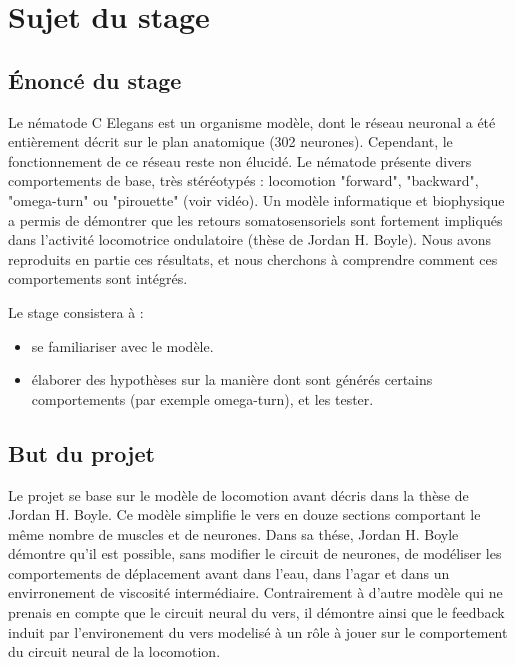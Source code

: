 \chapter{Sujet du stage} %
\label{cha:Sujet du stage}

\section{Énoncé du stage} %
\label{sec:Énoncé du stage}

Le nématode C Elegans est un organisme modèle, dont le réseau neuronal a été entièrement décrit sur le plan
anatomique (302 neurones). Cependant, le fonctionnement de ce réseau reste non élucidé. Le nématode présente
divers comportements de base, très stéréotypés : locomotion "forward", "backward", "omega-turn" ou "pirouette"
(voir vidéo). Un modèle informatique et biophysique a permis de démontrer que les retours somatosensoriels
sont fortement impliqués dans l’activité locomotrice ondulatoire (thèse de Jordan H. Boyle). Nous avons
reproduits en partie ces résultats, et nous cherchons à comprendre comment ces comportements sont intégrés.


Le stage consistera à :
\begin{itemize}
   \item se familiariser avec le modèle.
   \item élaborer des hypothèses sur la manière dont sont générés certains comportements (par exemple
      omega-turn), et les tester.
\end{itemize}


\section{But du projet} %
\label{sec:But du projet}

Le projet se base sur le modèle de locomotion avant décris dans la thèse de Jordan H. Boyle\cite{Boyle2009}.
Ce modèle simplifie le vers en douze sections comportant le même nombre de muscles et de neurones.
Dans sa thése, Jordan H. Boyle démontre qu'il est possible, sans modifier le circuit de neurones, de
modéliser les comportements de déplacement avant dans l'eau, dans l'agar et dans un envirronement
de viscosité intermédiaire. Contrairement à d'autre modèle qui ne prenais en compte que le circuit neural
du vers, il démontre ainsi que le feedback induit par l'environement du vers modelisé à un rôle à jouer sur le
comportement du circuit neural de la locomotion.

